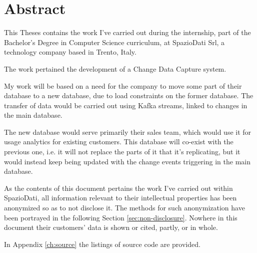 \chapter*{Abstract} %
\label{ch:abstract}


%


This Theses contains the work I've carried out during the internship, part of the Bachelor's Degree in Computer Science curriculum, at SpazioDati Srl, a technology company based in Trento, Italy.

The work pertained the development of a Change Data Capture system.

My work will be based on a need for the company to move some part of their database to a new database, due to load constraints on the former database.
The transfer of data would be carried out using Kafka streams, linked to changes in the main database.

The new database would serve primarily their sales team, which would use it for usage analytics for existing customers.
This database will co-exist with the previous one, i.e. it will not replace the parts of it that it's replicating, but it would instead keep being updated with the change events triggering in the main database.


As the contents of this document pertains the work I've carried out within SpazioDati, all information relevant to their intellectual properties has been anonymized so as to not disclose it.
The methods for such anonymization have been portrayed in the following Section \ref{sec:non-disclosure}.
Nowhere in this document their customers' data is shown or cited, partly, or in whole.

In Appendix \ref{ch:source} the listings of source code are provided.

